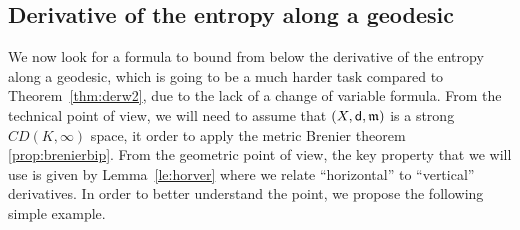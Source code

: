 \documentclass[reqno,11pt]{article}
\numberwithin{equation}{section}
\newcommand{\mm}{{\mbox{\boldmath$m$}}}
\newcommand{\sfd}{{\sf d}}
\renewcommand{\mm}{\mathfrak m}
\begin{document}
\subsection{Derivative of the entropy along a geodesic}\label{sub6}

We now look for a formula to bound from below the derivative of the
entropy along a geodesic, which is going to be a much harder task
compared to Theorem~\ref{thm:derw2}, due to the lack of a change of
variable formula. From the technical point of view, we will need to
assume that $(X,\sfd,\mm)$ is a strong $CD(K,\infty)$ space, it
order to apply the metric Brenier theorem \ref{prop:brenierbip}.
From the geometric point of view, the key property that we will use
is given by Lemma~\ref{le:horver} where we relate ``horizontal'' to
``vertical'' derivatives. In order to better understand the point,
we propose the following simple example.
\end{document}
